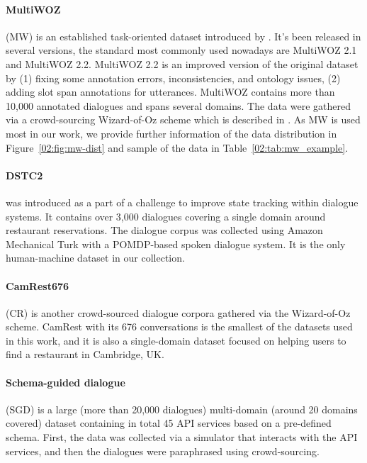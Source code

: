 \paragraph{MultiWOZ} (MW) is an established task-oriented dataset introduced by \cite{budzianowski-etal-2018-multiwoz}. It's been released in several versions, the standard most commonly used nowadays are MultiWOZ 2.1 and MultiWOZ 2.2.
MultiWOZ 2.2 is an improved version of the original dataset by (1) fixing some annotation errors, inconsistencies, and ontology issues, (2) adding slot span annotations for utterances.
MultiWOZ contains more than 10,000 annotated dialogues and spans several domains.
The data were gathered via a crowd-sourcing Wizard-of-Oz scheme which is described in \cite{wen-etal-2017-wizard-of-oz}.
As MW is used most in our work, we provide further information of the data distribution in Figure~\ref{02:fig:mw-dist} and sample of the data in Table~\ref{02:tab:mw_example}.

\paragraph{DSTC2} \cite{henderson_robust_2014} was introduced as a part of a challenge to improve state tracking within dialogue systems. It contains over 3,000 dialogues covering a single domain around restaurant reservations. The dialogue corpus was collected using Amazon Mechanical Turk with a POMDP-based spoken dialogue system. It is the only human-machine dataset in our collection.

\paragraph{CamRest676} (CR) \cite{wen2016network} is another crowd-sourced dialogue corpora gathered via the Wizard-of-Oz scheme. CamRest with its 676 conversations is the smallest of the datasets used in this work, and it is also a single-domain dataset focused on helping users to find a restaurant in Cambridge, UK. 

\paragraph{Schema-guided dialogue} (SGD) is a large (more than 20,000 dialogues) multi-domain (around 20 domains covered) dataset containing in total 45 API services based on a pre-defined schema. First, the data was collected via a simulator that interacts with the API services, and then the dialogues were paraphrased using crowd-sourcing. \\

